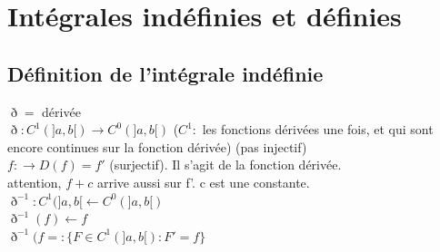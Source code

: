 \documentclass[12pt,a4paper]{article}
\begin{document}
{\section{Intégrales indéfinies et définies}
\setcounter{equation}{0}
\subsection{Définition de l'intégrale indéfinie}
$\eth =$ dérivée\\
$\eth: C^1(]a,b[) \to C^0(]a,b[)$ ($C^1:$ les fonctions dérivées une fois, et qui sont encore continues sur la fonction dérivée) (pas injectif)\\
$f: \to D(f) = f'$ (surjectif). Il s'agit de la fonction dérivée.\\
attention, $f+c$ arrive aussi sur f'. c est une constante. \\
$\eth^{-1} : C^1(]a,b[ \leftarrow C^0(]a,b[)$\\
$\eth^{-1}(f) \leftarrow f$\\
$\eth^{-1}(f= : \{F \in C^1(]a,b[) : F' = f\}$

}
\end{document}
